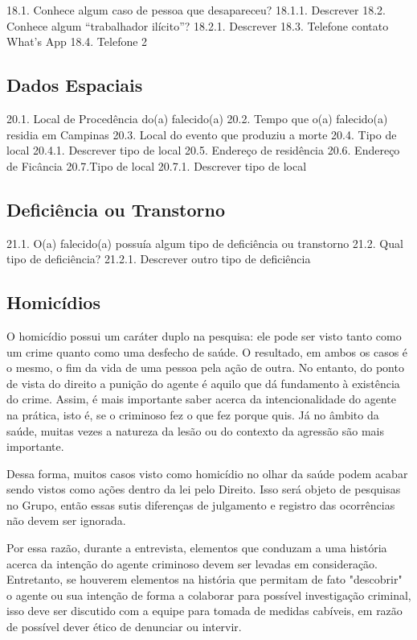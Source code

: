 18.1. Conhece algum caso de pessoa que desapareceu?
18.1.1. Descrever
18.2. Conhece algum “trabalhador ilícito”?
18.2.1. Descrever
18.3. Telefone contato What's App
18.4. Telefone 2

\subsection{Dados Espaciais}

20.1. Local de Procedência do(a) falecido(a)
20.2. Tempo que o(a) falecido(a) residia em Campinas
20.3. Local do evento que produziu a morte
20.4. Tipo de local
20.4.1. Descrever tipo de local
20.5. Endereço de residência
20.6. Endereço de Ficância
20.7.Tipo de local
20.7.1. Descrever tipo de local

\subsection{Deficiência ou Transtorno}

21.1. O(a) falecido(a) possuía algum tipo de deficiência ou transtorno
21.2. Qual tipo de deficiência?
21.2.1. Descrever outro tipo de deficiência

\subsection{Homicídios}

O homicídio possui um caráter duplo na pesquisa: ele pode ser visto tanto como um crime quanto como uma desfecho de saúde. O resultado, em ambos os casos é o mesmo, o fim da vida de uma pessoa pela ação de outra. No entanto, do ponto de vista do direito a punição do agente é aquilo que dá fundamento à existência do crime. Assim, é mais importante saber acerca da intencionalidade do agente na prática, isto é, se o criminoso fez o que fez porque quis. Já no âmbito da saúde, muitas vezes a natureza da lesão ou do contexto da agressão são mais importante.

Dessa forma, muitos casos visto como homicídio no olhar da saúde podem acabar sendo vistos como ações dentro da lei pelo Direito. Isso será objeto de pesquisas no Grupo, então essas sutis diferenças de julgamento e registro das ocorrências não devem ser ignorada.

Por essa razão, durante a entrevista, elementos que conduzam a uma história acerca da intenção do agente criminoso devem ser levadas em consideração. Entretanto, se houverem elementos na história que permitam de fato "descobrir" o agente ou sua intenção de forma a colaborar para possível investigação criminal, isso deve ser discutido com a equipe para tomada de medidas cabíveis, em razão de possível dever ético de denunciar ou intervir.

